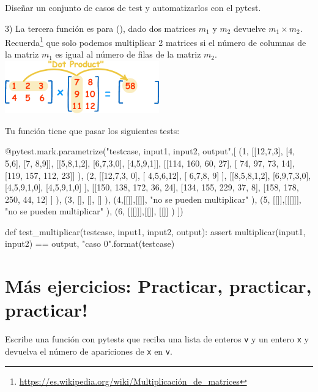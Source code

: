 \begin{ejercicio}
Diseñar un conjunto de casos de test y automatizarlos con el pytest.

3) La tercera función es para (), dado dos matrices $m_1$ y $m_2$ devuelve $m_1 \times m_2$. Recuerda\footnote{\url{https://es.wikipedia.org/wiki/Multiplicación_de_matrices}}
que solo podemos multiplicar 2 matrices si el número de columnas de la matriz $m_1$ es igual al número de filas de la matriz $m_2$.\\

\includegraphics[width=0.5\textwidth]{book/Spanish/05_Funciones/images/mult-matrix.png}

Tu función tiene que pasar los siguientes tests:

\begin{small}
\begin{python}
@pytest.mark.parametrize("testcase, input1, input2, output",[
(1, [[12,7,3], 
     [4, 5,6], 
     [7, 8,9]],
    [[5,8,1,2],
     [6,7,3,0],
     [4,5,9,1]],
    [[114, 160,  60, 27], 
     [ 74,  97,  73, 14], 
     [119, 157, 112, 23]]
),
(2, [[12,7,3, 0], 
     [ 4,5,6,12], 
     [ 6,7,8, 9]
    ],
    [[8,5,8,1,2],
     [6,9,7,3,0],
     [4,5,9,1,0],
     [4,5,9,1,0]
    ],
    [[150, 138, 172, 36, 24], 
     [134, 155, 229, 37, 8], 
     [158, 178, 250, 44, 12]
    ]
),
(3, [], [], []
),
(4,[[]],[[]], "no se pueden multiplicar"
),
(5, [[]],[[[]]], "no se pueden multiplicar"
),
(6, [[[]]],[[]], [[]]
)
])

def test_multiplicar(testcase, input1, input2, output):
    assert multiplicar(input1, input2) == output, 
           "caso {0}".format(testcase)
\end{python}
\end{small}


\end{ejercicio}


\section*{Más ejercicios: Practicar, practicar, practicar!}


\begin{ejercicio}Escribe una función con pytests  que reciba una lista de enteros \verb#v# y
   un entero \verb#x# y devuelva el n\'umero de apariciones de \verb#x# en \verb#v#.
\end{ejercicio}


